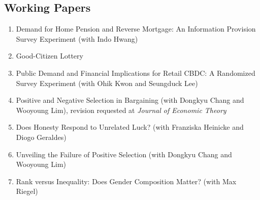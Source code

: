 \documentclass[margin, a4paper]{res}
\begin{document}
\begin{resume}
\section{Working Papers}
\begin{enumerate}[leftmargin=*]
\item Demand for Home Pension and Reverse Mortgage: An Information Provision Survey Experiment (with Indo Hwang)
\item Good-Citizen Lottery
\item Public Demand and Financial Implications for Retail CBDC: A Randomized Survey Experiment (with Ohik Kwon and Seungduck Lee)
\item Positive and Negative Selection in Bargaining (with Dongkyu Chang and Wooyoung Lim), revision requested at \emph{Journal of Economic Theory}
\item Does Honesty Respond to Unrelated Luck? (with Franziska Heinicke and Diogo Geraldes)
\item Unveiling the Failure of Positive Selection (with Dongkyu Chang and Wooyoung Lim)
\item Rank versus Inequality: Does Gender Composition Matter? (with Max Riegel)

\end{enumerate}



\end{resume}
\end{document}
